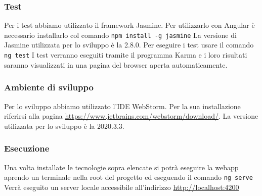\subsubsection{Test}
Per i test abbiamo utilizzato il framework Jasmine. Per utilizzarlo con Angular è necessario installarlo col comando \newline
	\texttt{npm install -g jasmine} \newline
La versione di Jasmine utilizzata per lo sviluppo è la 2.8.0. \newline
Per eseguire i test usare il comando \newline
	\texttt{ng test} \newline
I test verranno eseguiti tramite il programma Karma e i loro risultati saranno visualizzati in una pagina del browser aperta automaticamente.

\subsubsection{Ambiente di sviluppo}
Per lo sviluppo abbiamo utilizzato l'IDE WebStorm. Per la sua installazione riferirsi alla pagina \url{https://www.jetbrains.com/webstorm/download/}. La versione utilizzata per lo sviluppo è la 2020.3.3.

\subsubsection{Esecuzione}
Una volta installate le tecnologie sopra elencate si potrà eseguire la webapp aprendo un terminale nella root del progetto ed eseguendo il comando \newline
	\texttt{ng serve} \newline
Verrà eseguito un server locale accessibile all'indirizzo \url{http://localhost:4200}


